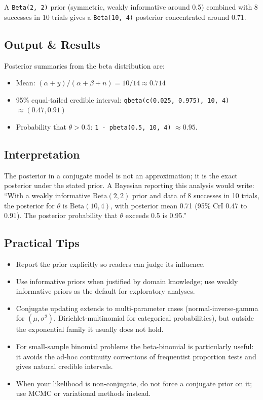 \documentclass[
]{article}
\providecommand{\tightlist}{%
  \setlength{\itemsep}{0pt}\setlength{\parskip}{0pt}}
\begin{document}
A \texttt{Beta(2,\ 2)} prior (symmetric, weakly informative around 0.5)
combined with 8 successes in 10 trials gives a \texttt{Beta(10,\ 4)}
posterior concentrated around 0.71.

\subsection{Output \& Results}\label{output-results}

Posterior summaries from the beta distribution are:

\begin{itemize}
\tightlist
\item
  Mean: \((\alpha + y)/(\alpha + \beta + n) = 10/14 \approx 0.714\)
\item
  95\% equal-tailed credible interval:
  \texttt{qbeta(c(0.025,\ 0.975),\ 10,\ 4)} \(\approx (0.47, 0.91)\)
\item
  Probability that \(\theta > 0.5\): \texttt{1\ -\ pbeta(0.5,\ 10,\ 4)}
  \(\approx 0.95\).
\end{itemize}

\subsection{Interpretation}\label{interpretation}

The posterior in a conjugate model is not an approximation; it is the
exact posterior under the stated prior. A Bayesian reporting this
analysis would write: ``With a weakly informative \(\text{Beta}(2, 2)\)
prior and data of 8 successes in 10 trials, the posterior for \(\theta\)
is \(\text{Beta}(10, 4)\), with posterior mean 0.71 (95\% CrI 0.47 to
0.91). The posterior probability that \(\theta\) exceeds 0.5 is 0.95.''

\subsection{Practical Tips}\label{practical-tips}

\begin{itemize}
\tightlist
\item
  Report the prior explicitly so readers can judge its influence.
\item
  Use informative priors when justified by domain knowledge; use weakly
  informative priors as the default for exploratory analyses.
\item
  Conjugate updating extends to multi-parameter cases
  (normal-inverse-gamma for \((\mu, \sigma^2)\), Dirichlet-multinomial
  for categorical probabilities), but outside the exponential family it
  usually does not hold.
\item
  For small-sample binomial problems the beta-binomial is particularly
  useful: it avoids the ad-hoc continuity corrections of frequentist
  proportion tests and gives natural credible intervals.
\item
  When your likelihood is non-conjugate, do not force a conjugate prior
  on it; use MCMC or variational methods instead.
\end{itemize}
\end{document}
